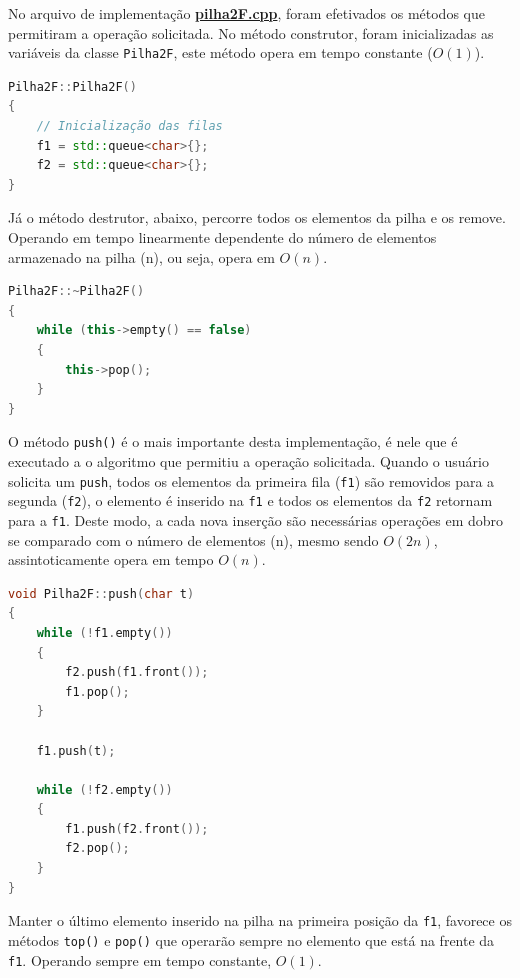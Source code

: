 \documentclass[
  brazilian,
  paper=a4,
  oneside  ,captions=tableheading
]{scrbook}
\newcommand{\passthrough}[1]{#1}
\begin{document}
No arquivo de implementação
\href{https://github.com/ecostadelle/lista_pilhas_filas/blob/main/include/pilha2F.cpp}{\textbf{pilha2F.cpp}},
foram efetivados os métodos que permitiram a operação solicitada. No
método construtor, foram inicializadas as variáveis da classe
\passthrough{\lstinline!Pilha2F!}, este método opera em tempo constante
(\(O(1)\)).

\begin{lstlisting}[language={C++}]
Pilha2F::Pilha2F()
{
    // Inicialização das filas
    f1 = std::queue<char>{};
    f2 = std::queue<char>{};
}
\end{lstlisting}

Já o método destrutor, abaixo, percorre todos os elementos da pilha e os
remove. Operando em tempo linearmente dependente do número de elementos
armazenado na pilha (n), ou seja, opera em \(O(n)\).

\begin{lstlisting}[language={C++}]
Pilha2F::~Pilha2F()
{
    while (this->empty() == false)
    {
        this->pop();
    }
}
\end{lstlisting}

O método \passthrough{\lstinline!push()!} é o mais importante desta
implementação, é nele que é executado a o algoritmo que permitiu a
operação solicitada. Quando o usuário solicita um
\passthrough{\lstinline!push!}, todos os elementos da primeira fila
(\passthrough{\lstinline!f1!}) são removidos para a segunda
(\passthrough{\lstinline!f2!}), o elemento é inserido na
\passthrough{\lstinline!f1!} e todos os elementos da
\passthrough{\lstinline!f2!} retornam para a
\passthrough{\lstinline!f1!}. Deste modo, a cada nova inserção são
necessárias operações em dobro se comparado com o número de elementos
(n), mesmo sendo \(O(2n)\), assintoticamente opera em tempo \(O(n)\).

\begin{lstlisting}[language={C++}]
void Pilha2F::push(char t)
{
    while (!f1.empty())
    {
        f2.push(f1.front());
        f1.pop();
    }

    f1.push(t);

    while (!f2.empty())
    {
        f1.push(f2.front());
        f2.pop();
    }
}
\end{lstlisting}

Manter o último elemento inserido na pilha na primeira posição da
\passthrough{\lstinline!f1!}, favorece os métodos
\passthrough{\lstinline!top()!} e \passthrough{\lstinline!pop()!} que
operarão sempre no elemento que está na frente da
\passthrough{\lstinline!f1!}. Operando sempre em tempo constante,
\(O(1)\).
\end{document}
